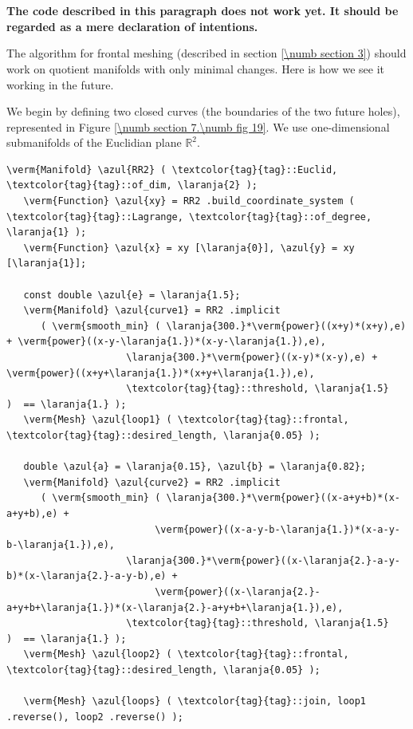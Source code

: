 \section{~~}
\label{\numb section 7.\numb parag 23}

{\normalfont\bfseries The code described in this paragraph does not work yet.
It should be regarded as a mere declaration of intentions.}
\medskip
{}

The algorithm for frontal meshing (described in section \ref{\numb section 3})
should work on quotient manifolds with only minimal changes.
Here is how we see it working in the future.

We begin by defining two closed curves (the boundaries of the two future holes),
represented in Figure \ref{\numb section 7.\numb fig 19}.
We use one-dimensional submanifolds of the Euclidian plane $ \mathbb{R}^2 $.

\begin{Verbatim}[commandchars=\\\{\},formatcom=\small\tt,frame=single,
   rulecolor=\color{moldura},baselinestretch=0.94,framesep=2mm         ]
   \verm{Manifold} \azul{RR2} ( \textcolor{tag}{tag}::Euclid, \textcolor{tag}{tag}::of_dim, \laranja{2} );
   \verm{Function} \azul{xy} = RR2 .build_coordinate_system ( \textcolor{tag}{tag}::Lagrange, \textcolor{tag}{tag}::of_degree, \laranja{1} );
   \verm{Function} \azul{x} = xy [\laranja{0}], \azul{y} = xy [\laranja{1}];

   const double \azul{e} = \laranja{1.5};
   \verm{Manifold} \azul{curve1} = RR2 .implicit 
      ( \verm{smooth_min} ( \laranja{300.}*\verm{power}((x+y)*(x+y),e) + \verm{power}((x-y-\laranja{1.})*(x-y-\laranja{1.}),e),
                     \laranja{300.}*\verm{power}((x-y)*(x-y),e) + \verm{power}((x+y+\laranja{1.})*(x+y+\laranja{1.}),e),
                     \textcolor{tag}{tag}::threshold, \laranja{1.5}                     )  == \laranja{1.} );
   \verm{Mesh} \azul{loop1} ( \textcolor{tag}{tag}::frontal, \textcolor{tag}{tag}::desired_length, \laranja{0.05} );
      
   double \azul{a} = \laranja{0.15}, \azul{b} = \laranja{0.82};
   \verm{Manifold} \azul{curve2} = RR2 .implicit 
      ( \verm{smooth_min} ( \laranja{300.}*\verm{power}((x-a+y+b)*(x-a+y+b),e) +
                          \verm{power}((x-a-y-b-\laranja{1.})*(x-a-y-b-\laranja{1.}),e),
                     \laranja{300.}*\verm{power}((x-\laranja{2.}-a-y-b)*(x-\laranja{2.}-a-y-b),e) +
                          \verm{power}((x-\laranja{2.}-a+y+b+\laranja{1.})*(x-\laranja{2.}-a+y+b+\laranja{1.}),e),
                     \textcolor{tag}{tag}::threshold, \laranja{1.5}                           )  == \laranja{1.} );
   \verm{Mesh} \azul{loop2} ( \textcolor{tag}{tag}::frontal, \textcolor{tag}{tag}::desired_length, \laranja{0.05} );

   \verm{Mesh} \azul{loops} ( \textcolor{tag}{tag}::join, loop1 .reverse(), loop2 .reverse() );                     
\end{Verbatim}

